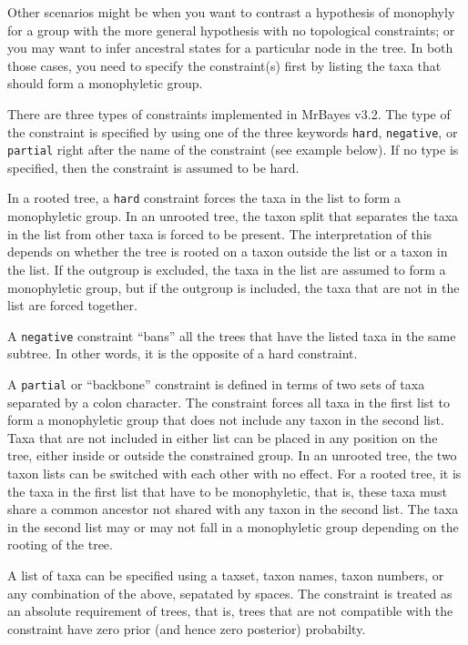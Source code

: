 \documentclass[12pt]{book}
\begin{document}
Other scenarios might be when you want to contrast a hypothesis of monophyly for a group with the
more general hypothesis with no topological constraints; or you may want to infer ancestral states
for a particular node in the tree. In both those cases, you need to specify the constraint(s) first
by listing the taxa that should form a monophyletic group.

There are three types of constraints implemented in MrBayes v3.2. The type of the constraint is
specified by using one of the three keywords \texttt{hard}, \texttt{negative}, or \texttt{partial}
right after the name of the constraint (see example below). If no type is specified, then the
constraint is assumed to be hard.

In a rooted tree, a \texttt{hard} constraint forces the taxa in the list to form a monophyletic
group.  In an unrooted tree, the taxon split that separates the taxa in the list from other taxa is
forced to be present. The interpretation of this depends on whether the tree is rooted on a taxon
outside the list or a taxon in the list. If the outgroup is excluded, the taxa in the list are
assumed to form a monophyletic group, but if the outgroup is included, the taxa that are not in the
list are forced together.

A \texttt{negative} constraint ``bans'' all the trees that have the listed taxa in the same
subtree.  In other words, it is the opposite of a hard constraint.

A \texttt{partial} or ``backbone'' constraint is defined in terms of two sets of taxa separated by
a colon character. The constraint forces all taxa in the first list to form a monophyletic group
that does not include any taxon in the second list. Taxa that are not included in either list can
be placed in any position on the tree, either inside or outside the constrained group. In an
unrooted tree, the two taxon lists can be switched with each other with no effect. For a rooted
tree, it is the taxa in the first list that have to be monophyletic, that is, these taxa must share
a common ancestor not shared with any taxon in the second list. The taxa in the second list may or
may not fall in a monophyletic group depending on the rooting of the tree.

A list of taxa can be specified using a taxset, taxon names, taxon numbers, or any combination of
the above, sepatated by spaces. The constraint is treated as an absolute requirement of trees, that
is, trees that are not compatible with the constraint have zero prior (and hence zero posterior)
probabilty.
\end{document}
